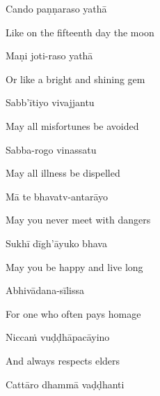 Cando paṇṇaraso yathā

\begin{english}
  Like on the fifteenth day the moon
\end{english}

Maṇi joti-raso yathā\hyperlink{endnote1-appendix}{\hypertarget{endnote1-body}{}}

\begin{english}
  Or like a bright and shining gem\\
\end{english}

Sabb'ītiyo vivajjantu\hyperlink{endnote1-appendix}{\hypertarget{endnote1-body}{}}

\begin{english}
  May all misfortunes be avoided
\end{english}

Sabba-rogo vinassatu

\begin{english}
  May all illness be dispelled
\end{english}

Mā te bhavatv-antarāyo

\begin{english}
  May you never meet with dangers
\end{english}

Sukhī dīgh'āyuko bhava

\begin{english}
  May you be happy and live long
\end{english}

Abhivādana-sīlissa

\begin{english}
  For one who often pays homage
\end{english}

Niccaṁ vuḍḍhāpacāyino

\begin{english}
  And always respects elders
\end{english}

Cattāro dhammā vaḍḍhanti

